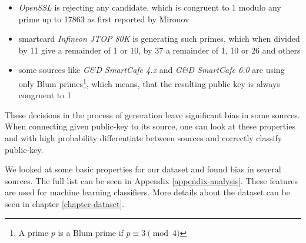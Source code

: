 \begin{itemize}

\item \textit{OpenSSL} is rejecting any candidate, which is congruent to 1 modulo any prime up to 17863 as first reported by Mironov\cite{mironov}

\item smartcard \textit{Infineon JTOP 80K} is generating such primes, which when divided by 11 give a remainder of 1 or 10, by 37 a remainder of 1, 10 or 26 and others

\item some sources like \textit{G\&D SmartCafe 4.x} and \textit{G\&D SmartCafe 6.0} are using only Blum primes\footnote{A prime $p$ is a Blum prime if $p \equiv 3 \pmod{4}$}, which means, that the resulting public key is always congruent to 1

\end{itemize}

These decisions in the process of generation leave significant bias in some sources. When connecting given public-key to its source, one can look at these properties and with high probability differentiate between sources and correctly classify public-key.

We looked at some basic properties for our dataset and found bias in several sources. The full list can be seen in Appendix \ref{appendix-analysis}. These features are used for machine learning classifiers. More details about the dataset can be seen in chapter \ref{chapter-dataset}.
